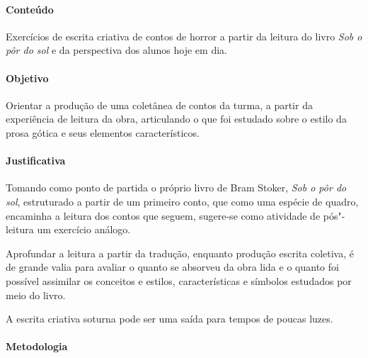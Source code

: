 \documentclass[12pt]{extarticle}
\begin{document}
\paragraph{Conteúdo} Exercícios de escrita criativa de contos de horror a partir
da leitura do livro \emph{Sob o pôr do sol} e da perspectiva dos alunos hoje em dia.

\paragraph{Objetivo} Orientar a produção de uma coletânea de contos da turma, a partir 
da experiência de leitura da obra, articulando o que foi estudado sobre o estilo da prosa 
gótica e seus elementos característicos. 

\paragraph{Justificativa} Tomando como ponto de partida o próprio livro de Bram Stoker, 
\textit{Sob o pôr do sol}, estruturado a partir de um primeiro conto, que como uma 
espécie de quadro, encaminha a leitura dos contos que seguem, sugere-se como atividade de pós"-leitura 
um exercício análogo. 

Aprofundar a leitura a partir da tradução, enquanto produção escrita coletiva, é de grande valia
para avaliar o quanto se absorveu da obra lida e o quanto foi possível assimilar os conceitos e 
estilos, características e símbolos estudados por meio do livro. 

A escrita criativa soturna pode ser uma saída para tempos de poucas luzes. 

\paragraph{Metodologia}
\end{document}
